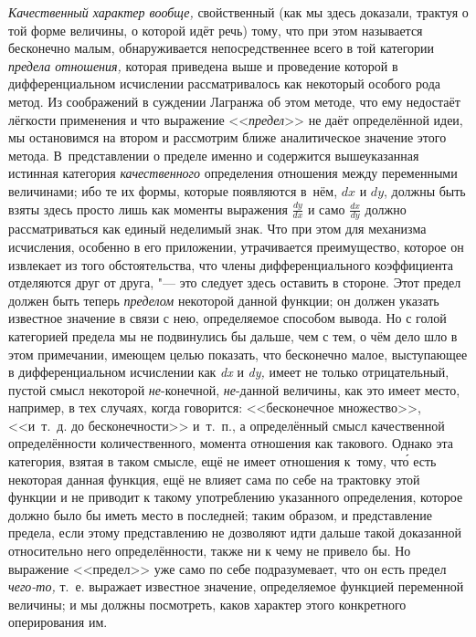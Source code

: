 {\em Качественный характер вообще,} свойственный (как мы здесь доказали,
трактуя о той форме величины, о которой идёт речь) тому, что при этом
называется бесконечно малым, обнаруживается непосредственнее всего в той
категории {\em предела отношения,} которая приведена выше и проведение которой
в дифференциальном исчислении рассматривалось как некоторый особого рода метод.
Из соображений в суждении Лагранжа об этом методе, что ему недостаёт лёгкости
применения и что выражение <<{\em предел}>> не даёт определённой идеи, мы
остановимся на втором и рассмотрим ближе аналитическое значение этого метода.
В~представлении о пределе именно и содержится вышеуказанная истинная категория
{\em качественного} определения отношения между переменными величинами; ибо те
их формы, которые появляются в~нём, $dx$ и $dy$, должны быть взяты
здесь просто лишь как моменты выражения $\frac{dy}{dx}$ и само $\frac{dx}{dy}$
должно рассматриваться как единый неделимый знак. Что при этом для механизма
исчисления, особенно в его приложении, утрачивается преимущество, которое он
извлекает из того обстоятельства, что члены дифференциального коэффициента
отделяются друг от друга, "--- это следует здесь оставить в стороне. Этот
предел должен быть теперь {\em пределом} некоторой данной функции; он должен
указать известное значение в связи с нею, определяемое способом вывода. Но с
голой категорией предела мы не подвинулись бы дальше, чем с тем, о чём дело шло
в этом примечании, имеющем целью показать, что бесконечно малое, выступающее в
дифференциальном исчислении как {\em dx} и {\em dy,} имеет не только
отрицательный, пустой смысл некоторой {\em не}-конечной, {\em не}-данной
величины, как это имеет место, например, в тех случаях, когда говорится:
<<бесконечное множество>>, <<и~т.~д. до бесконечности>> и~т.~п., а определённый
смысл качественной определённости количественного, момента отношения как
такового. Однако эта категория, взятая в таком смысле, ещё не имеет отношения
к~тому, чт\'{о} есть некоторая данная функция, ещё не влияет сама по себе на
трактовку этой функции и не приводит к такому употреблению указанного
определения, которое должно было бы иметь место в последней; таким образом, и
представление предела, если этому представлению не дозволяют идти дальше такой
доказанной относительно него определённости, также ни к чему не привело бы. Но
выражение <<предел>> уже само по себе подразумевает, что он есть предел
{\em чего-то,} т.~е. выражает известное значение, определяемое функцией
переменной величины; и мы должны посмотреть, каков характер этого конкретного
оперирования им.

